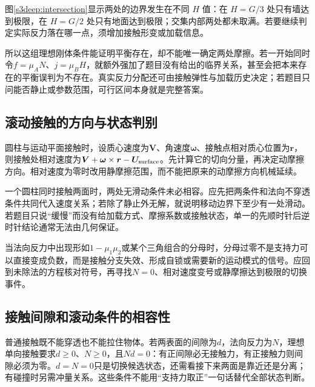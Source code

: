 图\ref{s3deep:intersection}显示两处的边界发生在不同 $H$ 值：在 $H=G/3$ 处只有墙达到极限，在 $H=G/2$ 处只有地面达到极限；交集内部两处都未取满。若要继续判定实际反力落在哪一点，须增加接触形变或加载信息。


所以这组理想刚体条件能证明平衡存在，却不能唯一确定两处摩擦。若一开始同时令$f=\mu_AN$、$j=\mu_BH$，就额外强加了题目没有给出的临界关系，甚至会把本来存在的平衡误判为不存在。真实反力分配还可由接触弹性与加载历史决定；若题目只问能否静止或参数范围，可行区间本身就是完整答案。

\subsection{滚动接触的方向与状态判别}
圆柱与运动平面接触时，设质心速度为$\boldsymbol V$、角速度$\boldsymbol\omega$、接触点相对质心位置为$\boldsymbol r$，则接触处相对速度为$\boldsymbol V+\boldsymbol\omega\times\boldsymbol r-\boldsymbol U_{\rm surface}$。先计算它的切向分量，再决定动摩擦方向。相对速度为零时改用静摩擦范围，而不能把原来的动摩擦方向机械延续。

一个圆柱同时接触两面时，两处无滑动条件未必相容。应先把两条件和法向不穿透条件共同代入速度关系；若除了静止外无解，就说明移动边界下至少有一处滑动。若题目只说“缓慢”而没有给加载方式、摩擦系数或接触状态，单一的先顺时针后逆时针结论通常无法由几何保证。

当法向反力中出现形如$1-\mu_1\mu_2$或某个三角组合的分母时，分母过零不是支持力可以直接变成负数，而是接触分支失效、形成自锁或需要新的运动模式的信号。应回到未除法的方程核对符号，再寻找$N=0$、相对速度变号或静摩擦达到极限的切换事件。


\subsection{接触间隙和滚动条件的相容性}
普通接触既不能穿透也不能拉住物体。若两表面的间隙为$d$，法向反力为$N$，理想单向接触要求$d\ge0$、$N\ge0$，且$Nd=0$：有正间隙必无接触力，有正接触力则间隙必须为零。$d=N=0$只是切换候选状态，还需看接下来两面是靠近还是分离；有碰撞时另需冲量关系。这些条件不能用“支持力取正”一句话替代全部状态判断。

